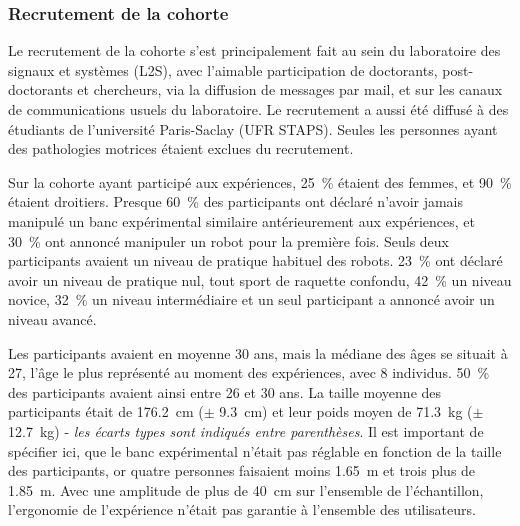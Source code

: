 \subsubsection{Recrutement de la cohorte} \label{chap4_sec_exp_sub_prot_1}

Le recrutement de la cohorte s'est principalement fait au sein du laboratoire des signaux et systèmes (L2S), avec l'aimable participation de doctorants, post-doctorants et chercheurs, via la diffusion de messages par mail, et sur les canaux de communications usuels du laboratoire. Le recrutement a aussi été diffusé à des étudiants de l'université Paris-Saclay (UFR STAPS). %
Seules les personnes ayant des pathologies motrices étaient exclues du recrutement.

Sur la cohorte ayant participé aux expériences, \SI{25}{\percent} étaient des femmes, et \SI{90}{\percent} étaient droitiers. Presque \SI{60}{\percent} des participants ont déclaré n'avoir jamais manipulé un banc expérimental similaire antérieurement aux expériences, et \SI{30}{\percent} ont annoncé manipuler un robot pour la première fois. Seuls deux participants avaient un niveau de pratique habituel des robots. \SI{23}{\percent} ont déclaré avoir un niveau de pratique nul, tout sport de raquette confondu, \SI{42}{\percent} un niveau novice, \SI{32}{\percent} un niveau intermédiaire et un seul participant a annoncé avoir un niveau avancé. 

Les participants avaient en moyenne 30 ans, mais la médiane des âges se situait à 27, l'âge le plus représenté au moment des expériences, avec 8 individus. \SI{50}{\percent} des participants avaient ainsi entre 26 et 30 ans. %
La taille moyenne des participants était de \SI{176.2}{\centi\meter} ($\pm$ \SI{9.3}{\centi\meter}) et leur poids moyen de \SI{71.3}{\kilogram} ($\pm$ \SI{12.7}{\kilogram}) - \textit{les écarts types sont indiqués entre parenthèses}. 
Il est important de spécifier ici, que le banc expérimental n'était pas réglable en fonction de la taille des participants, or quatre personnes faisaient moins \SI{1.65}{\meter} et trois plus de \SI{1.85}{\meter}. Avec une amplitude de plus de \SI{40}{\centi\meter} sur l'ensemble de l'échantillon, l'ergonomie de l'expérience n'était pas garantie à l'ensemble des utilisateurs.

